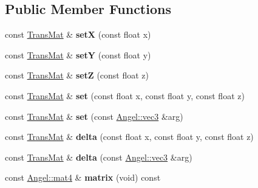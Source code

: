 \subsection*{Public Member Functions}
\begin{DoxyCompactItemize}
\item 
\hypertarget{class_trans_mat_afc0cc38bba734d8f668995cfbc263963}{const \hyperlink{class_trans_mat}{Trans\-Mat} \& {\bfseries set\-X} (const float x)}\label{class_trans_mat_afc0cc38bba734d8f668995cfbc263963}

\item 
\hypertarget{class_trans_mat_a97b2e285f76f35219389035b2121df69}{const \hyperlink{class_trans_mat}{Trans\-Mat} \& {\bfseries set\-Y} (const float y)}\label{class_trans_mat_a97b2e285f76f35219389035b2121df69}

\item 
\hypertarget{class_trans_mat_a957630c224fd750f0366a6422426ca43}{const \hyperlink{class_trans_mat}{Trans\-Mat} \& {\bfseries set\-Z} (const float z)}\label{class_trans_mat_a957630c224fd750f0366a6422426ca43}

\item 
\hypertarget{class_trans_mat_a4f4f05916524fb03c84a6a8e53769d52}{const \hyperlink{class_trans_mat}{Trans\-Mat} \& {\bfseries set} (const float x, const float y, const float z)}\label{class_trans_mat_a4f4f05916524fb03c84a6a8e53769d52}

\item 
\hypertarget{class_trans_mat_ac0b8a61381b2c7b21cc08d11e1959fd3}{const \hyperlink{class_trans_mat}{Trans\-Mat} \& {\bfseries set} (const \hyperlink{struct_angel_1_1vec3}{Angel\-::vec3} \&arg)}\label{class_trans_mat_ac0b8a61381b2c7b21cc08d11e1959fd3}

\item 
\hypertarget{class_trans_mat_abf67a3f4b41e34e423ebb921dace428f}{const \hyperlink{class_trans_mat}{Trans\-Mat} \& {\bfseries delta} (const float x, const float y, const float z)}\label{class_trans_mat_abf67a3f4b41e34e423ebb921dace428f}

\item 
\hypertarget{class_trans_mat_a4c93fe2c9ff1af5abf1ded66698cd297}{const \hyperlink{class_trans_mat}{Trans\-Mat} \& {\bfseries delta} (const \hyperlink{struct_angel_1_1vec3}{Angel\-::vec3} \&arg)}\label{class_trans_mat_a4c93fe2c9ff1af5abf1ded66698cd297}

\item 
\hypertarget{class_transformation_afcec300424207fc1d20864b73136937e}{const \hyperlink{class_angel_1_1mat4}{Angel\-::mat4} \& {\bfseries matrix} (void) const }\label{class_transformation_afcec300424207fc1d20864b73136937e}


\end{DoxyCompactItemize}
